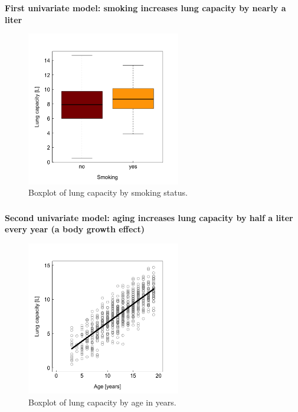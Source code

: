\documentclass{beamer}
\begin{document}
\begin{frame}
  \frametitle{}
\textbf{First univariate model: smoking increases lung capacity by nearly a liter}
  
  \begin{figure}[h]
    \includegraphics[width=0.6\textwidth]{lectures/day_3_LM_refresh_II/figures/unnamed-chunk-21-1.png} 
    \caption{Boxplot of lung capacity by smoking status.}
  \end{figure}
\end{frame}

\begin{frame}
  \frametitle{}
\textbf{Second univariate model: aging increases lung capacity by half a liter every year (a body growth effect)}
  
  \begin{figure}[h]
    \includegraphics[width=0.6\textwidth]{lectures/day_3_LM_refresh_II/figures/unnamed-chunk-23-1.png} 
    \caption{Boxplot of lung capacity by age in years.}
  \end{figure}
\end{frame}
\end{document}
